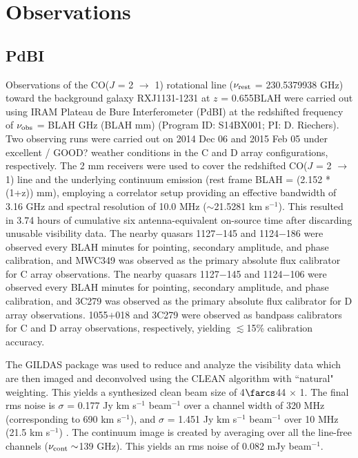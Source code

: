 \documentclass[]{emulateapj}
\begin{document}
\author{Draft}


\section{Observations}
\subsection{PdBI} \label{sec:PdBIdata}
Observations of the CO($J$ = 2 $\rightarrow$ 1) rotational line ($\nu_{\rm rest}$ = 230.5379938 GHz) toward the background galaxy RXJ1131-1231 at $z$ = 0.655BLAH
 were carried out using IRAM Plateau de Bure Interferometer (PdBI) at the redshifted frequency of $\nu_{\rm obs}$ = 
 BLAH GHz (BLAH mm) (Program ID: S14BX001; PI: D. Riechers). 
 Two observing runs were carried out on 2014 Dec 06 and 2015 Feb 05 under excellent / GOOD? 
weather conditions in the C and D array configurations, respectively. The 2 mm receivers were used to cover the redshifted CO($J$ = 2 $\rightarrow$ 1) line and the underlying continuum emission (rest frame BLAH = (2.152 * (1+z)) mm), employing a correlator setup providing an effective bandwidth of 3.16 GHz and spectral resolution of 10.0 MHz ($\sim$21.5281 km s$^{-1}$).
This resulted in 3.74 hours of cumulative six antenna-equivalent on-source time 
after discarding unusable visibility data.
The nearby quasars 1127$-$145 and 1124$-$186 were observed every BLAH minutes for
pointing, secondary amplitude, and phase calibration, and MWC349 was observed as the primary
absolute flux calibrator for C array observations.
The nearby quasars 1127$-$145 and 1124$-$106 were observed every BLAH minutes for
pointing, secondary amplitude, and phase calibration, and 3C279 was observed as the primary
absolute flux calibrator for D array observations.
1055$+$018 and 3C279 were observed as bandpass calibrators for C and D array observations, respectively, yielding $\lesssim
$15\% calibration accuracy.

The GILDAS package was used to reduce and analyze the visibility data which are then imaged and deconvolved using
the CLEAN algorithm with ``natural" weighting. This yields a synthesized clean beam size of 4$\farcs$44 $\times$ 1. The final rms noise is $\sigma$ = 0.177 Jy km s$^{-1}$ beam$^{-1}$ over a channel width of 320 MHz (corresponding to 690 km s$^{-1}$), and $\sigma$ = 1.451 Jy km s$^{-1}$ beam$^{-1}$ over 10 MHz (21.5 km s$^{-1}$) . 
The continuum image is created by %
averaging over all the line-free channels ($\nu_{\rm cont}\sim$139 GHz). This yields an rms noise of 0.082 mJy beam$^{-1}$. %
\end{document}
